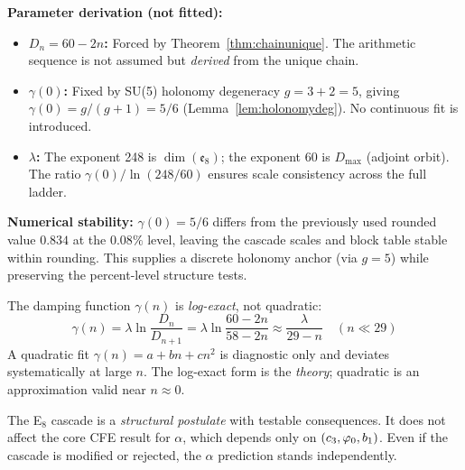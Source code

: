 \textbf{Parameter derivation (not fitted):}
\begin{itemize}[leftmargin=1.5em, topsep=2pt, itemsep=2pt]
    \item \textbf{$D_n = 60 - 2n$:} Forced by Theorem~\ref{thm:chainunique}. The 
        arithmetic sequence is not assumed but \emph{derived} from the unique chain.
    \item \textbf{$\gamma(0)$:} Fixed by SU(5) holonomy degeneracy $g=3+2=5$, giving $\gamma(0)=g/(g+1)=5/6$ (Lemma~\ref{lem:holonomydeg}). No continuous fit is introduced.
    \item \textbf{$\lambda$:} The exponent 248 is $\dim(\mathfrak{e}_8)$; the exponent 60 
        is $D_{\max}$ (adjoint orbit). The ratio $\gamma(0)/\ln(248/60)$ ensures scale 
        consistency across the full ladder.
\end{itemize}

\begin{remark}
\textbf{Numerical stability:} $\gamma(0)=5/6$ differs from the previously used rounded value $0.834$ at the $0.08\%$ level, leaving the cascade scales and block table stable within rounding. 
This supplies a discrete holonomy anchor (via $g=5$) while preserving the percent-level structure tests.
\end{remark}

\begin{tcolorbox}[colback=blue!3, colframe=blue!40, 
    title={\textbf{Lemma (Log-Exact vs.\ Quadratic)}}, fonttitle=\bfseries\small]
The damping function $\gamma(n)$ is \emph{log-exact}, not quadratic:
\begin{equation}
    \gamma(n) = \lambda \ln\frac{D_n}{D_{n+1}} = \lambda \ln\frac{60-2n}{58-2n} 
    \approx \frac{\lambda}{29-n} \quad (n \ll 29)
\end{equation}
A quadratic fit $\gamma(n) = a + bn + cn^2$ is diagnostic only and deviates 
systematically at large $n$. The log-exact form is the \emph{theory}; quadratic 
is an approximation valid near $n \approx 0$.
\end{tcolorbox}

\begin{remark}
The E$_8$ cascade is a \emph{structural postulate} with testable consequences. 
It does not affect the core CFE result for $\alpha$, which depends only on 
$(c_3, \varphi_0, b_1)$. Even if the cascade is modified or rejected, the 
$\alpha$ prediction stands independently.
\end{remark}

